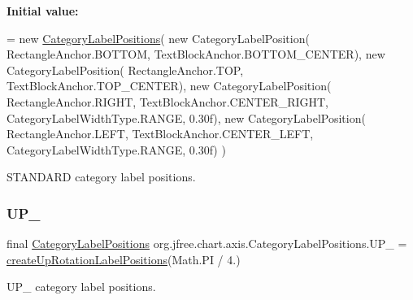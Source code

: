 {\bfseries Initial value\+:}
\begin{DoxyCode}
= \textcolor{keyword}{new} \mbox{\hyperlink{classorg_1_1jfree_1_1chart_1_1axis_1_1_category_label_positions_ac51d8b208b46dc8f7e5adfd72534d801}{CategoryLabelPositions}}(
            \textcolor{keyword}{new} CategoryLabelPosition(
                RectangleAnchor.BOTTOM, TextBlockAnchor.BOTTOM\_CENTER), 
            \textcolor{keyword}{new} CategoryLabelPosition(
                RectangleAnchor.TOP, TextBlockAnchor.TOP\_CENTER), 
            \textcolor{keyword}{new} CategoryLabelPosition(
                RectangleAnchor.RIGHT, TextBlockAnchor.CENTER\_RIGHT,
                CategoryLabelWidthType.RANGE, 0.30f), 
            \textcolor{keyword}{new} CategoryLabelPosition(
                RectangleAnchor.LEFT, TextBlockAnchor.CENTER\_LEFT,
                CategoryLabelWidthType.RANGE, 0.30f) 
        )
\end{DoxyCode}
S\+T\+A\+N\+D\+A\+RD category label positions. \mbox{\label{classorg_1_1jfree_1_1chart_1_1axis_1_1_category_label_positions_aae5315e3f13f832651b21d062ce97036}} 
\subsubsection{\texorpdfstring{U\+P\+\_}{UP\_45}}
{\footnotesize\ttfamily final \mbox{\hyperlink{classorg_1_1jfree_1_1chart_1_1axis_1_1_category_label_positions}{Category\+Label\+Positions}} org.\+jfree.\+chart.\+axis.\+Category\+Label\+Positions.\+U\+P\+\_ = \mbox{\hyperlink{classorg_1_1jfree_1_1chart_1_1axis_1_1_category_label_positions_a15845d31a6799d16451089dfac9c9b8b}{create\+Up\+Rotation\+Label\+Positions}}(Math.\+PI / 4.)\hspace{0.3cm}{\ttfamily [static]}}

U\+P\+\_ category label positions. \mbox{\label{classorg_1_1jfree_1_1chart_1_1axis_1_1_category_label_positions_a309062e5b26c7211a0ff5c9eca8b712b}} 
